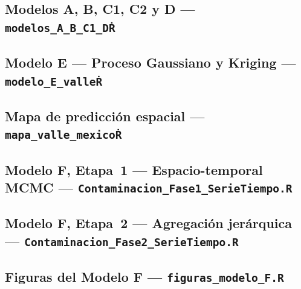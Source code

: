 ﻿\documentclass[12pt]{article}
\begin{document}
\subsection*{Modelos A, B, C1, C2 y D ---
             \texttt{modelos\_A\_B\_C1\_D\.R}}


\subsection*{Modelo E --- Proceso Gaussiano y Kriging ---
             \texttt{modelo\_E\_valle\.R}}


\subsection*{Mapa de predicci\'on espacial ---
             \texttt{mapa\_valle\_mexico\.R}}


\subsection*{Modelo F, Etapa~1 --- Espacio-temporal MCMC ---
             \texttt{Contaminacion\_Fase1\_SerieTiempo.R}}


\subsection*{Modelo F, Etapa~2 --- Agregaci\'on jer\'arquica ---
             \texttt{Contaminacion\_Fase2\_SerieTiempo.R}}


\subsection*{Figuras del Modelo F ---
             \texttt{figuras\_modelo\_F.R}}

\end{document}
